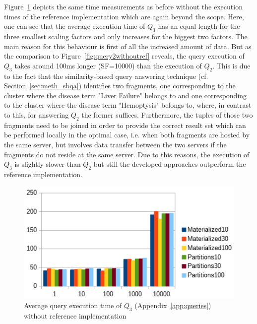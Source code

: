 Figure~\ref{fig:query3withoutref} depicts the same time measurements as before without the execution times of the reference implementation which are again beyond
the scope. Here, one can see that the average execution time of $Q_3$ has an equal length for the three smallest scaling factors and only increases for the
biggest two factors. The main reason for this behaviour is first of all the increased amount of data. But as the comparison to Figure~\ref{fig:query2withoutref}
reveals, the query execution of $Q_3$ takes around 100ms longer (SF=10000) than the execution of $Q_2$. This is due to the fact that the similarity-based query
answering technique (cf. Section~\ref{sec:meth_sbqa}) identifies two fragments, one corresponding to the cluster where the disease term "Liver Failure" belongs
to and one corresponding to the cluster where the disease term "Hemoptysis" belongs to, where, in contrast to this, for answering $Q_2$ the former suffices. 
Furthermore, the tuples of those two fragments need to be joined in order to provide the correct result set which can be performed locally in the optimal case,
i.e. when both fragments are hosted by the same server, but involves data transfer between the two servers if the fragments do not reside at the same server.
Due to this reasons, the execution of $Q_3$ is slightly slower than $Q_2$ but still the developed approaches outperform the reference implementation.
\begin{figure}[h]
    \centering
    \includegraphics[scale=0.9]{charts/Query3WithoutReference.pdf}
    \caption{Average query execution time of $Q_3$ (Appendix~\ref{app:queries}) without reference implementation}
    \label{fig:query3withoutref}
\end{figure}


